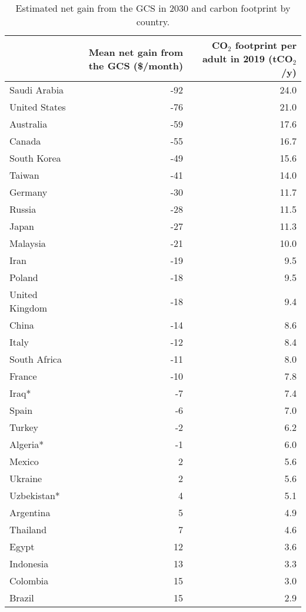 
\begin{longtable}[t]{lrr}
\caption{\label{tab:gain_gcs.tex}Estimated net gain from the GCS in 2030 and carbon footprint by country.}\\
\toprule
  & \makecell{Mean\\net gain\\from\\the GCS\\(\$/month)} & \makecell{CO$_\text{2}$\\footprint\\per adult\\in 2019\\(tCO$_\text{2}$/y)}\\
\midrule
Saudi Arabia & -92 & 24.0\\
United States & -76 & 21.0\\
Australia & -59 & 17.6\\
Canada & -55 & 16.7\\
South Korea & -49 & 15.6\\
Taiwan & -41 & 14.0\\
Germany & -30 & 11.7\\
Russia & -28 & 11.5\\
Japan & -27 & 11.3\\
Malaysia & -21 & 10.0\\
Iran & -19 & 9.5\\
Poland & -18 & 9.5\\
United Kingdom & -18 & 9.4\\
China & -14 & 8.6\\
Italy & -12 & 8.4\\
South Africa & -11 & 8.0\\
France & -10 & 7.8\\
Iraq* & -7 & 7.4\\
Spain & -6 & 7.0\\
Turkey & -2 & 6.2\\
Algeria* & -1 & 6.0\\
Mexico & 2 & 5.6\\
Ukraine & 2 & 5.6\\
Uzbekistan* & 4 & 5.1\\
Argentina & 5 & 4.9\\
Thailand & 7 & 4.6\\
Egypt & 12 & 3.6\\
Indonesia & 13 & 3.3\\
Colombia & 15 & 3.0\\
Brazil & 15 & 2.9\\

\end{longtable}
